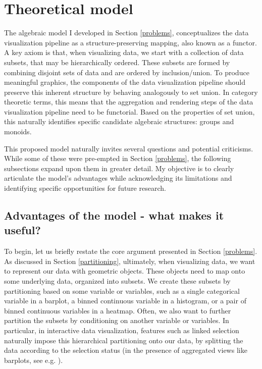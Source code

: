 \documentclass[
  openany]{book}
\theoremstyle{definition}
\theoremstyle{definition}
\theoremstyle{definition}
\theoremstyle{definition}
\theoremstyle{remark}
\begin{document}
\section{Theoretical model}\label{theoretical-model}

The algebraic model I developed in Section \ref{problems}, conceptualizes the data visualization pipeline as a structure-preserving mapping, also known as a functor. A key axiom is that, when visualizing data, we start with a collection of data subsets, that may be hierarchically ordered. These subsets are formed by combining disjoint sets of data and are ordered by inclusion/union. To produce meaningful graphics, the components of the data visualization pipeline should preserve this inherent structure by behaving analogously to set union. In category theoretic terms, this means that the aggregation and rendering steps of the data visualization pipeline need to be functorial. Based on the properties of set union, this naturally identifies specific candidate algebraic structures: groups and monoids.

This proposed model naturally invites several questions and potential criticisms. While some of these were pre-empted in Section \ref{problems}, the following subsections expand upon them in greater detail. My objective is to clearly articulate the model's advantages while acknowledging its limitations and identifying specific opportunities for future research.

\subsection{Advantages of the model - what makes it useful?}\label{advantages-of-the-model---what-makes-it-useful}

To begin, let us briefly restate the core argument presented in Section \ref{problems}. As discussed in Section \ref{partitioning}, ultimately, when visualizing data, we want to represent our data with geometric objects. These objects need to map onto some underlying data, organized into subsets. We create these subsets by partitioning based on some variable or variables, such as a single categorical variable in a barplot, a binned continuous variable in a histogram, or a pair of binned continuous variables in a heatmap. Often, we also want to further partition the subsets by conditioning on another variable or variables. In particular, in interactive data visualization, features such as linked selection naturally impose this hierarchical partitioning onto our data, by splitting the data according to the selection status (in the presence of aggregated views like barplots, see e.g. ).
\end{document}
